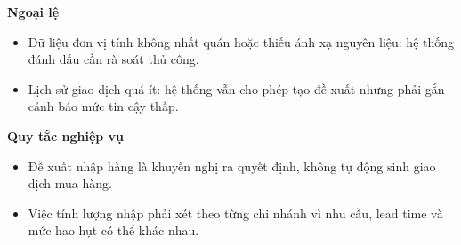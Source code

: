 \documentclass[11pt,a4paper]{article}
\begin{document}
\begin{usecasebox}[title={UC-INV-03 --- Phân tích tiêu hao và đề xuất nhập hàng}]
    \textbf{Ngoại lệ}
    \begin{itemize}[leftmargin=1.8em]
  \item Dữ liệu đơn vị tính không nhất quán hoặc thiếu ánh xạ nguyên liệu: hệ thống đánh dấu cần rà soát thủ công.
  \item Lịch sử giao dịch quá ít: hệ thống vẫn cho phép tạo đề xuất nhưng phải gắn cảnh báo mức tin cậy thấp.
\end{itemize}

    \textbf{Quy tắc nghiệp vụ}
    \begin{itemize}[leftmargin=1.8em]
  \item Đề xuất nhập hàng là khuyến nghị ra quyết định, không tự động sinh giao dịch mua hàng.
  \item Việc tính lượng nhập phải xét theo từng chi nhánh vì nhu cầu, lead time và mức hao hụt có thể khác nhau.
\end{itemize}
    \end{usecasebox}
\end{document}
